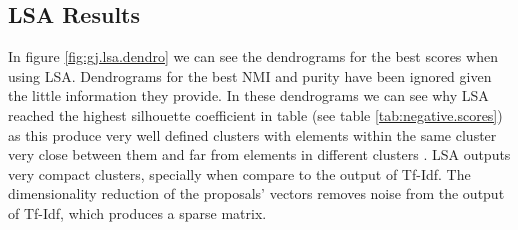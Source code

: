 \FloatBarrier
\subsection{LSA Results}
In figure \ref{fig:gj.lsa.dendro} we can see the dendrograms for the best scores when using LSA. Dendrograms for the best NMI and purity have been ignored given the little information they provide. In these dendrograms we can see why LSA reached the highest silhouette coefficient in table (see table \ref{tab:negative.scores}) as this produce very well defined clusters with elements within the same cluster very close between them and far from elements in different clusters . LSA outputs very compact clusters, specially when compare to the output of Tf-Idf. The dimensionality reduction of the proposals' vectors removes noise from the output of Tf-Idf, which produces a sparse matrix.

